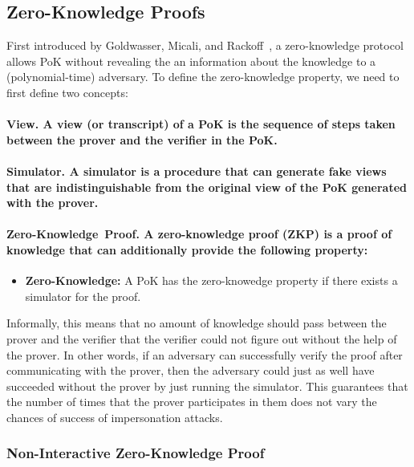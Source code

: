 \documentclass[11pt]{article}
\theoremstyle{plain}
\begin{document}
\subsection{Zero-Knowledge Proofs}

First introduced by Goldwasser, Micali, and Rackoff~\cite{Goldwasser:1985:KCI},
a zero-knowledge protocol allows PoK without revealing the an information
about the knowledge to a (polynomial-time) adversary. To define the
zero-knowledge property, we need to first define two concepts:

\paragraph{View. \textmd{A view (or transcript) of a PoK is the sequence of
		steps taken between the prover and the verifier in the PoK.}}

\paragraph{Simulator. \textmd{A simulator is a procedure that can generate fake
		views that are indistinguishable from the original view of the PoK
		generated with the prover.}}

\paragraph{Zero-Knowledge~Proof. \textmd{A zero-knowledge proof (ZKP) is a
		proof of knowledge that can additionally provide the following property:}}
\begin{itemize}
	\item \textbf{Zero-Knowledge: }A PoK has the zero-knowedge property if there
	exists a simulator for the proof.
\end{itemize}
Informally, this means that no amount of knowledge should pass between
the prover and the verifier that the verifier could not figure out
without the help of the prover. In other words, if an adversary can
successfully verify the proof after communicating with the prover,
then the adversary could just as well have succeeded without the prover
by just running the simulator. This guarantees that the number of
times that the prover participates in them does not vary the chances
of success of impersonation attacks.

\subsubsection{Non-Interactive Zero-Knowledge Proof}
\end{document}
